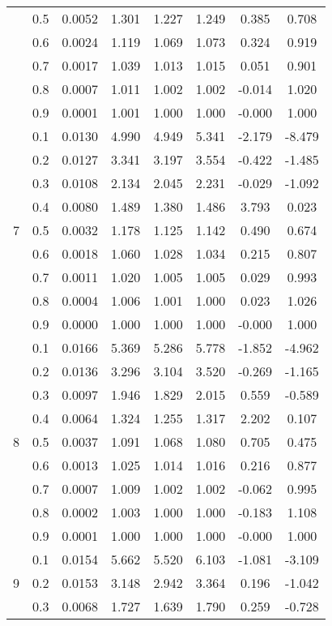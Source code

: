 \documentclass[11pt,a4paper]{report}
\begin{document}
\begin{longtable}{ | c | c || c | c | c | c | c | c | }
 & 0.5 & 0.0052 & 1.301 & 1.227 & 1.249 & 0.385 & 0.708 \\
 & 0.6 & 0.0024 & 1.119 & 1.069 & 1.073 & 0.324 & 0.919 \\
 & 0.7 & 0.0017 & 1.039 & 1.013 & 1.015 & 0.051 & 0.901 \\
 & 0.8 & 0.0007 & 1.011 & 1.002 & 1.002 & -0.014 & 1.020 \\
 & 0.9 & 0.0001 & 1.001 & 1.000 & 1.000 & -0.000 & 1.000 \\
 \hline
\multirow{9}{*}{7} & 0.1 & 0.0130 & 4.990 & 4.949 & 5.341 & -2.179 & -8.479 \\
 & 0.2 & 0.0127 & 3.341 & 3.197 & 3.554 & -0.422 & -1.485 \\
 & 0.3 & 0.0108 & 2.134 & 2.045 & 2.231 & -0.029 & -1.092 \\
 & 0.4 & 0.0080 & 1.489 & 1.380 & 1.486 & 3.793 & 0.023 \\
 & 0.5 & 0.0032 & 1.178 & 1.125 & 1.142 & 0.490 & 0.674 \\
 & 0.6 & 0.0018 & 1.060 & 1.028 & 1.034 & 0.215 & 0.807 \\
 & 0.7 & 0.0011 & 1.020 & 1.005 & 1.005 & 0.029 & 0.993 \\
 & 0.8 & 0.0004 & 1.006 & 1.001 & 1.000 & 0.023 & 1.026 \\
 & 0.9 & 0.0000 & 1.000 & 1.000 & 1.000 & -0.000 & 1.000 \\
 \hline
\multirow{9}{*}{8} & 0.1 & 0.0166 & 5.369 & 5.286 & 5.778 & -1.852 & -4.962 \\
 & 0.2 & 0.0136 & 3.296 & 3.104 & 3.520 & -0.269 & -1.165 \\
 & 0.3 & 0.0097 & 1.946 & 1.829 & 2.015 & 0.559 & -0.589 \\
 & 0.4 & 0.0064 & 1.324 & 1.255 & 1.317 & 2.202 & 0.107 \\
 & 0.5 & 0.0037 & 1.091 & 1.068 & 1.080 & 0.705 & 0.475 \\
 & 0.6 & 0.0013 & 1.025 & 1.014 & 1.016 & 0.216 & 0.877 \\
 & 0.7 & 0.0007 & 1.009 & 1.002 & 1.002 & -0.062 & 0.995 \\
 & 0.8 & 0.0002 & 1.003 & 1.000 & 1.000 & -0.183 & 1.108 \\
 & 0.9 & 0.0001 & 1.000 & 1.000 & 1.000 & -0.000 & 1.000 \\
 \hline
\multirow{9}{*}{9} & 0.1 & 0.0154 & 5.662 & 5.520 & 6.103 & -1.081 & -3.109 \\
 & 0.2 & 0.0153 & 3.148 & 2.942 & 3.364 & 0.196 & -1.042 \\
 & 0.3 & 0.0068 & 1.727 & 1.639 & 1.790 & 0.259 & -0.728 \\

\end{longtable}
\end{document}
